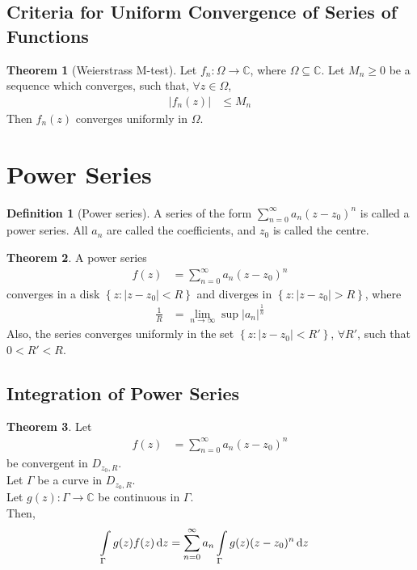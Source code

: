 \documentclass[titlepage, fleqn, a4paper, 12pt, twoside]{article}
\theoremstyle{definition}
\newtheorem{definition}{Definition}
\theoremstyle{theorem}
\newtheorem{theorem}{Theorem}
\begin{document}
\subsection{Criteria for Uniform Convergence of Series of Functions}

\begin{theorem}[Weierstrass M-test]
	Let $f_n : \Omega \to \mathbb{C}$, where $\Omega \subseteq \mathbb{C}$.
	Let $M_n \ge 0$ be a sequence which converges, such that, $\forall z \in \Omega$,
	\begin{align*}
		\left| f_n(z) \right| & \le M_n
	\end{align*}
	Then $f_n(z)$ converges uniformly in $\Omega$.
	\label{thm:Weierstrass_M-test}
\end{theorem}

\section{Power Series}

\begin{definition}[Power series]
	A series of the form $\sum\limits_{n = 0}^{\infty} a_n (z - z_0)^n$ is called a power series.
	All $a_n$ are called the coefficients, and $z_0$ is called the centre.
\end{definition}

\begin{theorem}
	A power series
	\begin{align*}
		f(z) & = \sum\limits_{n = 0}^{\infty} a_n (z - z_0)^n
	\end{align*}
	converges in a disk $\left\{ z : |z - z_0| < R \right\}$ and diverges in $\left\{ z : |z - z_0| > R \right\}$, where
	\begin{align*}
		\frac{1}{R} & = \lim\limits_{n \to \infty} \sup|a_n|^{\frac{1}{n}}
	\end{align*}
	Also, the series converges uniformly in the set $\left\{ z : |z - z_0| < R' \right\}$, $\forall R'$, such that $0 < R' < R$.
\end{theorem}

\subsection{Integration of Power Series}

\begin{theorem}
	Let
	\begin{align*}
		f(z) & = \sum\limits_{n = 0}^{\infty} a_n (z - z_0)^n
	\end{align*}
	be convergent in $D_{z_0,R}$.\\
	Let $\Gamma$ be a curve in $D_{z_0,R}$.\\
	Let $g(z) : \Gamma \to \mathbb{C}$ be continuous in $\Gamma$.\\
	Then,
	\begin{align*}
		\int\limits_{\Gamma} g(z) f(z) \dif z & = \sum\limits_{n = 0}^{\infty} a_n \int\limits_{\Gamma} g(z) (z - z_0)^n \dif z
	\end{align*}
\end{theorem}
\end{document}
